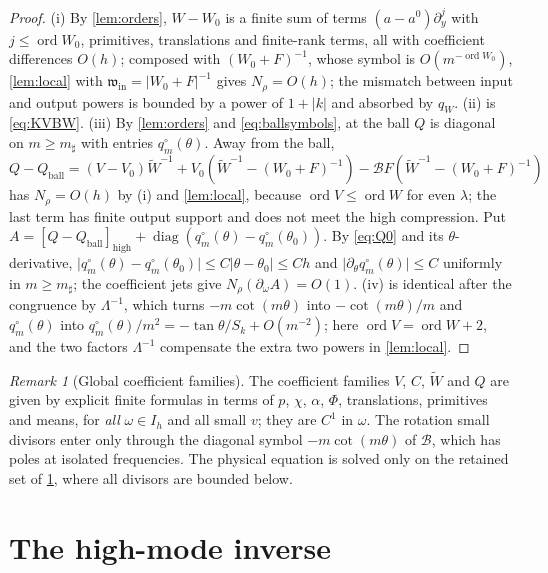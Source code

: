 \documentclass[11pt]{amsart}
\numberwithin{equation}{section}
\theoremstyle{definition}
\theoremstyle{remark}
\newtheorem{remark}[theorem]{Remark}
\newcommand{\abs}[1]{\lvert #1\rvert}
\newcommand{\cB}{\mathcal B}
\begin{document}
\begin{proof}
(i) By \cref{lem:orders}, $W-W_0$ is a finite sum of terms $(a-a^0)\partial_y^j$ with $j\le\operatorname{ord}W_0$, primitives, translations and finite-rank terms, all with coefficient differences $O(h)$; composed with $(W_0+F)^{-1}$, whose symbol is $O(m^{-\operatorname{ord}W_0})$, \cref{lem:local} with $\mathfrak w_{\mathrm{in}}=\abs{W_0+F}^{-1}$ gives $N_\rho=O(h)$; the mismatch between input and output powers is bounded by a power of $1+\abs k$ and absorbed by $q_W$. (ii) is \eqref{eq:KVBW}. (iii) By \cref{lem:orders} and \eqref{eq:ballsymbols}, at the ball $Q$ is diagonal on $m\ge m_\sharp$ with entries $q^\circ_m(\theta)$. Away from the ball, $Q-Q_{\mathrm{ball}}=(V-V_0)\widetilde W^{-1}+V_0(\widetilde W^{-1}-(W_0+F)^{-1})-\cB F(\widetilde W^{-1}-(W_0+F)^{-1})$ has $N_\rho=O(h)$ by (i) and \cref{lem:local}, because $\operatorname{ord}V\le\operatorname{ord}W$ for even $\lambda$; the last term has finite output support and does not meet the high compression. Put $A=[Q-Q_{\mathrm{ball}}]_{\mathrm{high}}+\operatorname{diag}(q^\circ_m(\theta)-q^\circ_m(\theta_0))$. By \eqref{eq:Q0} and its $\theta$-derivative, $\abs{q^\circ_m(\theta)-q^\circ_m(\theta_0)}\le C\abs{\theta-\theta_0}\le Ch$ and $\abs{\partial_\theta q^\circ_m(\theta)}\le C$ uniformly in $m\ge m_\sharp$; the coefficient jets give $N_\rho(\partial_\omega A)=O(1)$. (iv) is identical after the congruence by $\Lambda^{-1}$, which turns $-m\cot(m\theta)$ into $-\cot(m\theta)/m$ and $q^\circ_m(\theta)$ into $q^\circ_m(\theta)/m^2=-\tan\theta/S_k+O(m^{-2})$; here $\operatorname{ord}V=\operatorname{ord}W+2$, and the two factors $\Lambda^{-1}$ compensate the extra two powers in \cref{lem:local}.
\end{proof}

\begin{remark}[Global coefficient families]\label{rem:extension}
The coefficient families $V$, $C$, $\widetilde W$ and $Q$ are given by explicit finite formulas in terms of $p$, $\chi$, $\alpha$, $\Phi$, translations, primitives and means, for \emph{all} $\omega\in I_h$ and all small $v$; they are $C^1$ in $\omega$. The rotation small divisors enter only through the diagonal symbol $-m\cot(m\theta)$ of $\cB$, which has poles at isolated frequencies. The physical equation is solved only on the retained set of \cref{sec:schur}, where all divisors are bounded below.
\end{remark}

\section{The high-mode inverse}\label{sec:schur}
\end{document}
